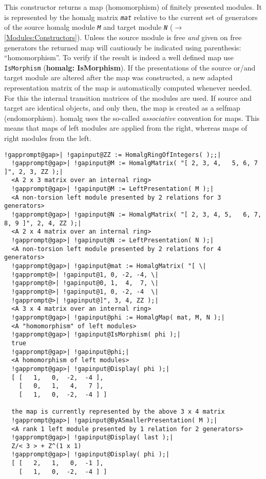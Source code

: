 \documentclass[a4paper,11pt]{report}
\begin{document}
{{{ This constructor returns a map (homomorphism) of finitely presented modules.
It is represented by the \textsf{homalg} matrix \mbox{\texttt{\mdseries\slshape mat}} relative to the current set of generators of the source \textsf{homalg} module \mbox{\texttt{\mdseries\slshape M}} and target module \mbox{\texttt{\mdseries\slshape N}} ($\to$ \ref{Modules:Constructors}). Unless the source module is free \emph{and} given on free generators the returned map will cautiously be indicated using
parenthesis: ``homomorphism''. To verify if the result is indeed a well defined map use \texttt{IsMorphism} (\textbf{homalg: IsMorphism}). If the presentations of the source or/and target module are altered after
the map was constructed, a new adapted representation matrix of the map is
automatically computed whenever needed. For this the internal transition
matrices of the modules are used. If source and target are identical objects,
and only then, the map is created as a selfmap (endomorphism). \textsf{homalg} uses the so-called \emph{associative} convention for maps. This means that maps of left modules are applied from the
right, whereas maps of right modules from the left. 
\begin{Verbatim}[commandchars=!@|,fontsize=\small,frame=single,label=Example]
  !gapprompt@gap>| !gapinput@ZZ := HomalgRingOfIntegers( );;|
  !gapprompt@gap>| !gapinput@M := HomalgMatrix( "[ 2, 3, 4,   5, 6, 7 ]", 2, 3, ZZ );|
  <A 2 x 3 matrix over an internal ring>
  !gapprompt@gap>| !gapinput@M := LeftPresentation( M );|
  <A non-torsion left module presented by 2 relations for 3 generators>
  !gapprompt@gap>| !gapinput@N := HomalgMatrix( "[ 2, 3, 4, 5,   6, 7, 8, 9 ]", 2, 4, ZZ );|
  <A 2 x 4 matrix over an internal ring>
  !gapprompt@gap>| !gapinput@N := LeftPresentation( N );|
  <A non-torsion left module presented by 2 relations for 4 generators>
  !gapprompt@gap>| !gapinput@mat := HomalgMatrix( "[ \|
  !gapprompt@>| !gapinput@1, 0, -2, -4, \|
  !gapprompt@>| !gapinput@0, 1,  4,  7, \|
  !gapprompt@>| !gapinput@1, 0, -2, -4  \|
  !gapprompt@>| !gapinput@]", 3, 4, ZZ );|
  <A 3 x 4 matrix over an internal ring>
  !gapprompt@gap>| !gapinput@phi := HomalgMap( mat, M, N );|
  <A "homomorphism" of left modules>
  !gapprompt@gap>| !gapinput@IsMorphism( phi );|
  true
  !gapprompt@gap>| !gapinput@phi;|
  <A homomorphism of left modules>
  !gapprompt@gap>| !gapinput@Display( phi );|
  [ [   1,   0,  -2,  -4 ],
    [   0,   1,   4,   7 ],
    [   1,   0,  -2,  -4 ] ]
  
  the map is currently represented by the above 3 x 4 matrix
  !gapprompt@gap>| !gapinput@ByASmallerPresentation( M );|
  <A rank 1 left module presented by 1 relation for 2 generators>
  !gapprompt@gap>| !gapinput@Display( last );|
  Z/< 3 > + Z^(1 x 1)
  !gapprompt@gap>| !gapinput@Display( phi );|
  [ [   2,   1,   0,  -1 ],
    [   1,   0,  -2,  -4 ] ]
  

\end{Verbatim}}}}
\end{document}
